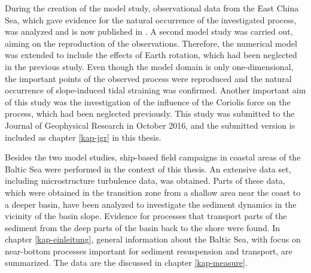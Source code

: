 During the creation of the model study, observational data from the East China 
Sea, which gave evidence for the natural occurrence of the investigated 
process, was analyzed and is now published in \cite{Endohetal2016a}. A second 
model study was carried out, aiming on the reproduction of the observations. 
Therefore, the numerical model was extended to include the effects of Earth 
rotation, which had been neglected in the previous study. Even though the model 
domain is only one-dimensional, the important points of the observed process 
were reproduced and the natural occurrence of slope-induced tidal straining was 
confirmed. Another important aim of this study was the investigation of the 
influence of the Coriolis force on the process, which had been neglected 
previously. This study was submitted to the Journal of Geophysical Research in 
October 2016, and the submitted version is included as chapter \ref{kap-jgr} in 
this thesis.

Besides the two model studies, ship-based field campaigns in coastal areas of 
the Baltic Sea were performed in the context of this thesis. An extensive data 
set, including microstructure turbulence data, was obtained. Parts of these 
data, which were obtained in the transition zone from a shallow area near the 
coast to a deeper basin, have been analyzed to investigate the sediment 
dynamics in the vicinity of the basin slope. Evidence for processes that 
transport parts of the sediment from the deep parts of the basin back to the 
shore were found. In chapter \ref{kap-einleitung}, general information about 
the Baltic Sea, with focus on near-bottom processes important for sediment 
resuspension and transport, are summarized. The data are the discussed in 
chapter \ref{kap-measure}.
